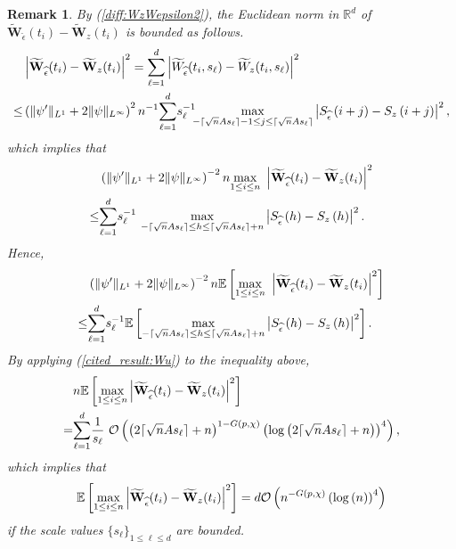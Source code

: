 \documentclass{amsart}
\newtheorem{Remark}{Remark}
\begin{document}
\begin{Remark}\label{remark:approximation}
By (\ref{diff:WzWepsilon2}),
the Euclidean norm in $\mathbb{R}^{d}$ of $\widetilde{\mathbf{W}}_{\widehat{\epsilon}}(t_{i})-\widetilde{\mathbf{W}}_{z}(t_{i})$
is bounded as follows.
\begin{align}\notag
&\left|\widetilde{\mathbf{W}}_{\widehat{\epsilon}}(t_{i})-\widetilde{\mathbf{W}}_{z}(t_{i})\right|^{2}
=
\overset{d}{\underset{\ell=1}{\sum}}
\left|\widetilde{W}_{\widehat{\epsilon}}(t_{i},s_{\ell}) -\widetilde{W}_{z}(t_{i},s_{\ell})\right|^{2}
\\\notag\leq& \left(\|\psi'\|_{L^{1}}+2\|\psi\|_{L^{\infty}}\right)^{2}n^{-1}
\overset{d}{\underset{\ell=1}{\sum}}s_{\ell}^{-1}\hspace{-0.1cm}\underset{-\lceil \sqrt{n}As_{\ell}\rceil-1 \leq j\leq \lceil \sqrt{n}As_{\ell}\rceil}{\max}\left|S_{\widehat{\epsilon}}\left(i+j\right) -S_{z}\left(i+j\right)\right|^{2},
\end{align}
which implies that
\begin{align}\notag
&\left(\|\psi'\|_{L^{1}}+2\|\psi\|_{L^{\infty}}\right)^{-2}n\underset{1\leq i\leq n}{\max}\ \left|\widetilde{\mathbf{W}}_{\widehat{\epsilon}}(t_{i})-\widetilde{\mathbf{W}}_{z}(t_{i})\right|^{2}
\\\notag
\leq&\overset{d}{\underset{\ell=1}{\sum}}s_{\ell}^{-1}\ \underset{-\lceil \sqrt{n}As_{\ell}\rceil \leq h\leq \lceil \sqrt{n}As_{\ell}\rceil+n}{\max}\left|S_{\widehat{\epsilon}}\left(h\right) -S_{z}\left(h\right)\right|^{2}.
\end{align}
Hence,
\begin{align}\notag
&\left(\|\psi'\|_{L^{1}}+2\|\psi\|_{L^{\infty}}\right)^{-2}n\mathbb{E}\left[\underset{1\leq i\leq n}{\max}\ \left|\widetilde{\mathbf{W}}_{\widehat{\epsilon}}(t_{i})-\widetilde{\mathbf{W}}_{z}(t_{i})\right|^{2}\right]
\\\notag\leq&\overset{d}{\underset{\ell=1}{\sum}}s_{\ell}^{-1}\mathbb{E}\left[\underset{-\lceil \sqrt{n}As_{\ell}\rceil \leq h\leq \lceil \sqrt{n}As_{\ell}\rceil+n}{\max}\left|S_{\widehat{\epsilon}}\left(h\right) -S_{z}\left(h\right)\right|^{2}\right].
\end{align}
By applying (\ref{cited_result:Wu})
to the inequality above,
\begin{align}\notag
&n\mathbb{E}\left[\underset{1\leq i\leq n}{\max}\left|\widetilde{\mathbf{W}}_{\widehat{\epsilon}}(t_{i})-\widetilde{\mathbf{W}}_{z}(t_{i})\right|^{2}\right]
\\\notag=&\overset{d}{\underset{\ell=1}{\sum}}\frac{1}{s_{\ell}}\
\mathcal{O}\left(\left(2\lceil \sqrt{n}As_{\ell}\rceil+n\right)^{1-G(p,\chi)}\left(\log\left(2\lceil \sqrt{n}As_{\ell}\rceil+n\right)\right)^{4}\right),
\end{align}
which implies that
\begin{align}\notag
\mathbb{E}\left[\underset{1\leq i\leq n}{\max}\left|\widetilde{\mathbf{W}}_{\widehat{\epsilon}}(t_{i})-\widetilde{\mathbf{W}}_{z}(t_{i})\right|^{2}\right]
=d\mathcal{O}\left(n^{-G(p,\chi)}\left(\log\left(n\right)\right)^{4}\right)
\end{align}
if the scale values $\{s_{\ell}\}_{1\leq \ell\leq d}$ are bounded.
\end{Remark}





\end{document}
